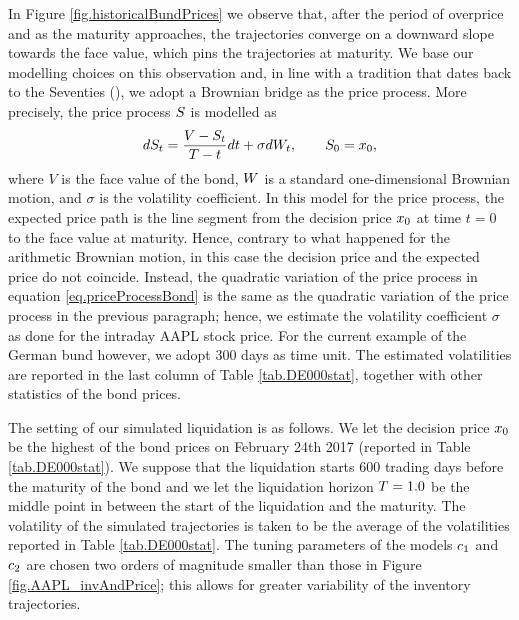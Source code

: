 \documentclass[10pt,a4paper]{article}
\begin{document}
In Figure \ref{fig.historicalBundPrices} we observe that, after the period of overprice and as the maturity approaches, the trajectories converge on a downward slope towards the face value, which pins the trajectories at maturity. We base our modelling choices on this observation and, in line with a tradition that dates back to the Seventies (\cite{Boy70sto}), we adopt a Brownian bridge as the price process. More precisely, the price process $S$ is modelled as 
\begin{equation}\label{eq.priceProcessBond}
dS_t = \frac{V - S_t}{T - t} dt + \sigma dW_t, \qquad S_0=x_0,
\end{equation}  
where $V$ is the face value of the bond, $W$ is a standard one-dimensional Brownian motion, and $\sigma$ is the volatility coefficient. In this model for the price process, the expected price path is the line segment from the decision price $x_0$ at time $t=0$ to the face value at maturity. Hence, contrary to what happened for the arithmetic Brownian motion,  in this case the decision price and the expected price do not coincide. Instead, the quadratic variation of the price process in equation \eqref{eq.priceProcessBond} is the same as the quadratic variation of the price process in the previous  paragraph; hence, we estimate the volatility coefficient $\sigma$ as done for the intraday AAPL stock price. For the current example of the German bund however, we adopt 300 days as time unit. The estimated volatilities are reported in the last column of Table \ref{tab.DE000stat}, together with other statistics of the bond prices. 

The setting of our simulated liquidation is as follows. We let the decision price $x_0$ be the highest  of the bond prices on February 24th 2017 (reported in Table \ref{tab.DE000stat}). We suppose that the liquidation starts 600 trading days before the maturity of the bond and we let the liquidation horizon $T = 1.0$ be the middle point in between the start of the liquidation and the maturity. The volatility of the simulated trajectories is taken to be the average of the volatilities reported in Table \ref{tab.DE000stat}. The tuning parameters of the models $c_{1}$ and $c_{2}$ are chosen two orders of magnitude smaller than those in Figure \ref{fig.AAPL_invAndPrice}; this allows for greater variability of the inventory trajectories.
\end{document}
